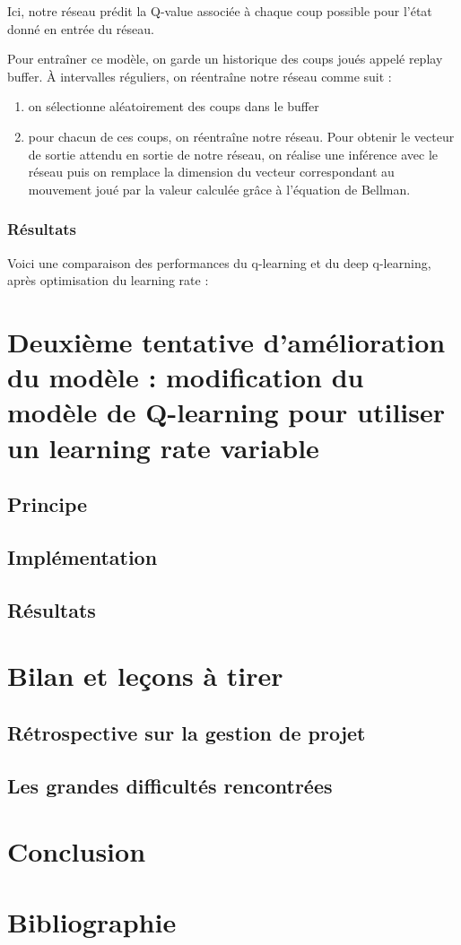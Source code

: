 \documentclass[french]{article}
\begin{document}
    Ici, notre réseau prédit la Q-value associée à chaque coup possible pour l'état donné en entrée du réseau.

    Pour entraîner ce modèle, on garde un historique des coups joués appelé replay buffer. À intervalles réguliers, on réentraîne notre réseau comme suit :
    \begin{enumerate}
        \item on sélectionne aléatoirement des coups dans le buffer
        \item pour chacun de ces coups, on réentraîne notre réseau. Pour obtenir le vecteur de sortie attendu en sortie de notre réseau, on réalise une inférence avec le réseau puis on remplace la dimension du vecteur correspondant au mouvement joué par la valeur calculée grâce à l'équation de Bellman.
    \end{enumerate}

    \subsubsection{Résultats}

    Voici une comparaison des performances du q-learning et du deep q-learning, après optimisation du learning rate :
    


    \section{Deuxième tentative d'amélioration du modèle : modification du modèle de Q-learning pour utiliser un learning rate variable}
    \subsection{Principe}
    \subsection{Implémentation}
    \subsection{Résultats}

    \section{Bilan et leçons à tirer}
    \subsection{Rétrospective sur la gestion de projet}
    \subsection{Les grandes difficultés rencontrées}

    \section{Conclusion}

    \section*{Bibliographie}
\end{document}
